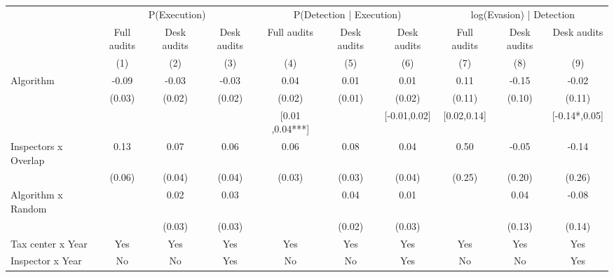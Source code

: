 \begin{tabular}{lccc|ccc|ccc} \toprule
\multicolumn{1}{l}{} & \multicolumn{3}{c}{P(Execution)} & \multicolumn{3}{c}{P(Detection | Execution)} & \multicolumn{3}{c}{log(Evasion) | Detection} \\\cmidrule(lr){2-4}\cmidrule(lr){5-7}\cmidrule(lr){8-10} \multicolumn{1}{l}{} & Full audits & Desk audits & Desk audits & Full audits & Desk audits & Desk audits & Full audits & Desk audits & Desk audits \\ \multicolumn{1}{l}{} & (1) & (2) & (3) & (4) & (5) & (6) & (7) & (8) & (9) \\ \midrule
Algorithm   &       -0.09\sym{***}&       -0.03\sym{*}  &       -0.03\sym{*}  &        0.04\sym{**} &        0.01         &        0.01         &        0.11         &       -0.15         &       -0.02         \\
            &      (0.03)         &      (0.02)         &      (0.02)         &      (0.02)         &      (0.01)         &      (0.02)         &      (0.11)         &      (0.10)         &      (0.11)         \\
\addlinespace
 & & & & [0.01 ,0.04***] & & [-0.01,0.02] & [0.02,0.14] & & [-0.14*,0.05] \\  Inspectors x Overlap&        0.13\sym{**} &        0.07\sym{*}  &        0.06         &        0.06\sym{*}  &        0.08\sym{**} &        0.04         &        0.50\sym{**} &       -0.05         &       -0.14         \\
            &      (0.06)         &      (0.04)         &      (0.04)         &      (0.03)         &      (0.03)         &      (0.04)         &      (0.25)         &      (0.20)         &      (0.26)         \\
\addlinespace
Algorithm x Random&                     &        0.02         &        0.03         &                     &        0.04\sym{*}  &        0.01         &                     &        0.04         &       -0.08         \\
            &                     &      (0.03)         &      (0.03)         &                     &      (0.02)         &      (0.03)         &                     &      (0.13)         &      (0.14)         \\
\midrule
Tax center x Year&         Yes         &         Yes         &         Yes         &         Yes         &         Yes         &         Yes         &         Yes         &         Yes         &         Yes         \\
Inspector x Year&          No         &          No         &         Yes         &          No         &          No         &         Yes         &          No         &          No         &         Yes         \\

\end{tabular}
